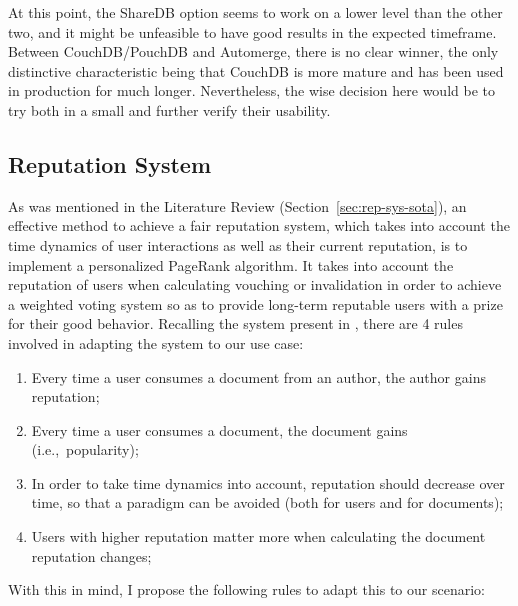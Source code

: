 At this point, the ShareDB option seems to work on a lower level than the other two, and it might be unfeasible to have good results in the expected timeframe. Between CouchDB/PouchDB and Automerge, there is no clear winner, the only distinctive characteristic being that CouchDB is more mature and has been used in production for much longer. Nevertheless, the wise decision here would be to try both in a small  and further verify their usability. 

\subsection{Reputation System} \label{sec:problem-solution-rep-sys}
As was mentioned in the Literature Review (Section~\ref{sec:rep-sys-sota}), an effective method to achieve a fair reputation system, which takes into account the time dynamics of user interactions as well as their current reputation, is to implement a personalized PageRank algorithm. It takes into account the reputation of users when calculating vouching or invalidation in order to achieve a weighted voting system so as to provide long-term reputable users with a prize for their good behavior. Recalling the system present in \cite{Daly2009}, there are 4 rules involved in adapting the system to our use case:

\begin{enumerate}
    \item Every time a user consumes a document from an author, the author gains reputation;
    \item Every time a user consumes a document, the document gains  (i.e.,\ popularity);
    \item In order to take time dynamics into account, reputation should decrease over time, so that a  paradigm can be avoided (both for users and for documents);
    \item Users with higher reputation matter more when calculating the document reputation changes;
\end{enumerate}

With this in mind, I propose the following rules to adapt this to our scenario:

